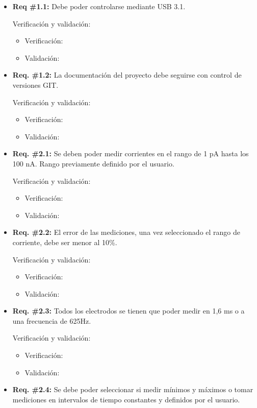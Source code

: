 \documentclass[11pt]{charter}
\begin{document}
\begin{itemize}
\item \textbf{Req \#1.1:} Debe poder controlarse mediante USB 3.1.

Verificación y validación:
\begin{itemize}
\item Verificación: 
\item Validación: 
\end{itemize}

\item \textbf{Req. \#1.2:} La documentación del proyecto debe seguirse con control de versiones GIT.

Verificación y validación:
\begin{itemize}
\item Verificación: 
\item Validación: 
\end{itemize}

\item\textbf{ Req. \#2.1:} Se deben poder medir corrientes en el rango de 1 pA hasta los 100 nA. Rango previamente definido por el usuario.

Verificación y validación:
\begin{itemize}
\item Verificación: 
\item Validación: 
\end{itemize}

\item \textbf{Req. \#2.2:} El error de las mediciones, una vez seleccionado el rango de corriente, debe ser menor al 10\%.

Verificación y validación:
\begin{itemize}
\item Verificación: 
\item Validación: 
\end{itemize}

\item \textbf{Req. \#2.3:} Todos los electrodos se tienen que poder medir en 1,6 ms o a una frecuencia de 625Hz.

Verificación y validación:
\begin{itemize}
\item Verificación: 
\item Validación: 
\end{itemize}

\item \textbf{Req. \#2.4:} Se debe poder seleccionar si medir mínimos y máximos o tomar mediciones en intervalos de tiempo constantes y definidos por el usuario.


\end{itemize}
\end{document}
